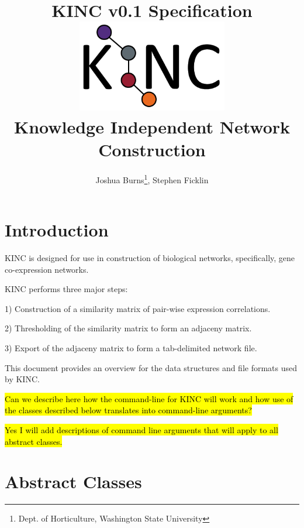 \documentclass[10pt]{article}
\providecommand{\stephen}[1]{\sethlcolor{lyellow}\hl{#1}}
\providecommand{\josh}[1]{\sethlcolor{lblue}\hl{#1}}
\begin{document}
\title{\textbf{KINC v0.1 Specification}\\
\vspace{1mm}
\includegraphics[width=8cm,height=4cm]{KINClogo.png}
\\Knowledge Independent Network Construction}
\author{Joshua Burns\thanks{Dept. of Horticulture, Washington State University}, Stephen Ficklin\footnotemark[1]}
\maketitle

\newpage
\tableofcontents

\newpage
\section{Introduction}

KINC is designed for use in construction of biological networks, specifically, 
gene co-expression networks.

KINC performs three major steps:

\begin{list}{}{}
\item[1)] Construction of a similarity matrix of pair-wise expression 
correlations.
\item[2)] Thresholding of the similarity matrix to form an adjaceny matrix.
\item[3)] Export of the adjaceny matrix to form a tab-delimited network file.
\end{list}

This document provides an overview for the data structures and file formats 
used 
by KINC. 

\stephen{Can we describe here how the command-line for KINC will work and how
use of the classes described below translates into command-line arguments?}

\josh{Yes I will add descriptions of command line arguments that will apply to 
all abstract classes.}

\newpage
\section{Abstract Classes}
\end{document}
